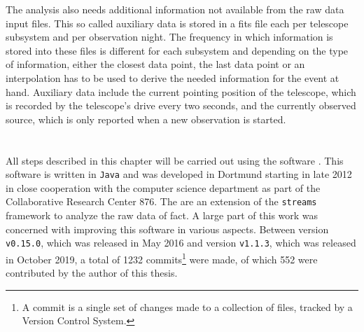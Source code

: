 The analysis also needs additional information not available from the raw data
input files.
This so called auxiliary data is stored in a \gls{fits} file each per telescope subsystem and per
observation night. 
The frequency in which information is stored into these files is different for each
subsystem and depending on the type of information, either the closest data point,
the last data point or an interpolation has to be used to derive the needed information
for the event at hand. 
Auxiliary data include the current pointing position of the telescope, which
is recorded by the telescope's drive every two seconds, and the currently observed
source, which is only reported when a new observation is started.

\section{\facttools{}}

All steps described in this chapter will be carried out using the software
\facttools{}\cite{fact-tools}.
This software is written in \texttt{Java} and was developed in Dortmund starting in late 
2012 in close cooperation with the computer science department as part of the
Collaborative Research Center 876.
The \facttools{} are an extension of the \texttt{streams} framework \cite{phd-bockermann}
to analyze the raw data of \gls{fact}.
A large part of this work was concerned with improving this software in various aspects.
Between version \texttt{v0.15.0}, which was released in May 2016 and version \texttt{v1.1.3},
which was released in October 2019, a total of 1232 commits\footnote{A commit is a single set of changes
made to a collection of files, tracked by a Version Control System.} were made, of which
552 were contributed by the author of this thesis.

